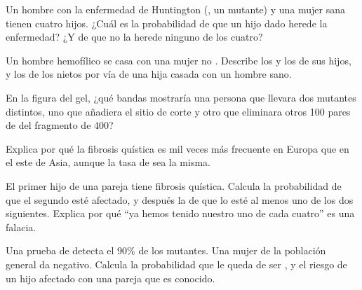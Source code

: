 \begin{exercise}[$\star\star$]\label{exo:g11:genes-and-disease:8}
Un hombre con la enfermedad de Huntington (, un  mutante)
y una mujer sana tienen cuatro hijos. ¿Cuál es la probabilidad de que
un hijo dado herede la enfermedad? ¿Y de que no la herede ninguno de
los cuatro?
\end{exercise}

\begin{exercise}[$\star\star$]\label{exo:g11:genes-and-disease:9}
Un hombre hemofílico se casa con una mujer no . Describe los
 y los  de sus hijos, y los de los nietos por vía de
una hija casada con un hombre sano.
\end{exercise}

\begin{exercise}[$\star\star$]\label{exo:g11:genes-and-disease:10}
En la figura del gel, ¿qué bandas mostraría una persona que llevara dos
 mutantes distintos, uno que añadiera el sitio de corte y otro
que eliminara otros 100 pares de  del fragmento de 400?
\end{exercise}

\begin{exercise}[$\star\star$]\label{exo:g11:genes-and-disease:11}
Explica por qué la fibrosis quística es mil veces más frecuente en
Europa que en el este de Asia, aunque la tasa de  sea la misma.
\end{exercise}

\begin{exercise}[$\star\star\star$]\label{exo:g11:genes-and-disease:12}
El primer hijo de una pareja tiene fibrosis quística. Calcula la
probabilidad de que el segundo esté afectado, y después la de que lo
esté al menos uno de los dos siguientes. Explica por qué ``ya hemos
tenido nuestro uno de cada cuatro'' es una falacia.
\end{exercise}

\begin{exercise}[$\star\star\star$]\label{exo:g11:genes-and-disease:13}
Una prueba de  detecta el 90\% de los  mutantes. Una
mujer de la población general da negativo. Calcula la probabilidad que
le queda de ser , y el riesgo de un hijo afectado con una
pareja que es  conocido.
\end{exercise}

